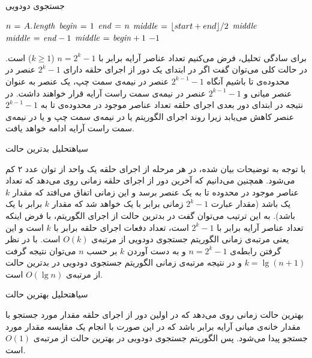 {\begin{algorithm}
\caption{جستجوی دودویی}\label{ch1:alg:binSearch}
\begin{latin}
\begin{algorithmic}[1]
		\State	$n \mathrel{\hspace{1pt}=\hspace{1pt}} A.\hspace*{1pt}\mathit{length}$
		\State	$\mathit{begin} \mathrel{\hspace{1pt}=\hspace{1pt}} 1$
		\State	$\mathit{end} \mathrel{\hspace{1pt}=\hspace{1pt}} n$
				\State	$ \mathit{middle} \mathrel{\hspace{1pt}=\hspace{1pt}} \lfloor start+end \rfloor / 2 $
						\State	\Return $\mathit{middle}$
						\State	$\mathit{middle} \mathrel{\hspace{1pt}=\hspace{1pt}} \mathit{end} - 1$
				\Else	
					 	\State	$\mathit{middle} \mathrel{\hspace{1pt}=\hspace{1pt}} \mathit{begin} + 1$	
				\EndIf
		\EndWhile
		\State	\Return	$-1$
\EndFunction
\end{algorithmic}
\end{latin}
\end{algorithm}


برای سادگی تحلیل، فرض می‌کنیم تعداد عناصر آرایه برابر با {$n=2^{k}-1$} ({$k\geqslant 1$}) است. در حالت کلی می‌توان گفت اگر در ابتدای یک دور از اجرای حلقه دارای {$2^{k}-1$} عنصر در محدوده‌ی {} تا {} باشیم آنگاه {$2^{k-1}-1$} عنصر در نیمه‌ی سمت چپ، یک عنصر به عنوان عنصر میانی و {$2^{k-1}-1$} عنصر در نیمه‌ی سمت راست آرایه قرار خواهند داشت. در نتیجه در ابتدای دور بعدی اجرای حلقه تعداد عناصر موجود در محدوده‌ی {} تا {} به {$2^{k-1}-1$} عنصر کاهش می‌یابد زیرا روند اجرای الگوریتم یا در نیمه‌ی سمت چپ و یا در نیمه‌ی سمت راست آرایه ادامه خواهد یافت.

‌سیاه{تحلیل بدترین حالت}

با توجه به توضیحات بیان شده، در هر مرحله از اجرای حلقه یک واحد از توان عدد ۲ کم می‌شود. همچنین می‌دانیم که آخرین دور از اجرای حلقه زمانی روی می‌دهد که تعداد عناصر موجود در محدوده {} تا {} به یک عنصر برسد و این زمانی اتفاق می‌افتد که مقدار {$k$} یک باشد (مقدار عبارت {$2^{k}-1$} زمانی برابر با یک خواهد شد که مقدار {$k$} برابر با یک باشد). به این ترتیب می‌توان گفت در بدترین حالت از اجرای الگوریتم، با فرض اینکه تعداد عناصر آرایه برابر با {$2^{k}-1$} است، تعداد دفعات اجرای حلقه برابر با {$k$} است و این یعنی مرتبه‌ی زمانی الگوریتم جستجوی دودویی از مرتبه‌ی {$O(k)$} است. با در نظر گرفتن رابطه‌ی {$n=2^k-1$} و به دست آوردن {$k$} بر حسب {$n$} می‌توان نتیجه گرفت {$k=\lg (n+1)$} و در نتیجه مرتبه‌ی زمانی الگوریتم جستجوی دودویی در بدترین حالت از مرتبه‌ی {$O(\lg n)$} است.

‌سیاه{تحلیل بهترین حالت}

بهترین حالت زمانی روی می‌دهد که در اولین دور از اجرای حلقه مقدار مورد جستجو با مقدار خانه‌ی میانی آرایه برابر باشد که در این صورت با انجام یک مقایسه مقدار مورد جستجو پیدا می‌شود. پس الگوریتم جستجوی دودویی در بهترین حالت از مرتبه‌ی {$O(1)$} است.

}
